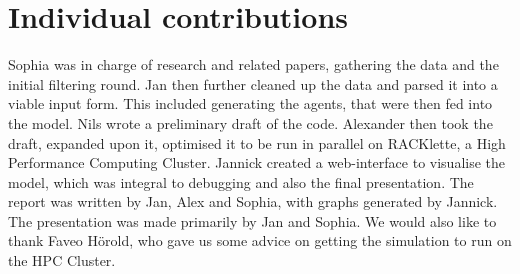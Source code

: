 \section{Individual contributions}
Sophia was in charge of research and related papers, gathering the data and the initial filtering round. Jan then further cleaned up the data and parsed it into a viable input form. This included generating the agents, that were then fed into the model. Nils wrote a preliminary draft of the code. Alexander then took the draft, expanded upon it, optimised it to be run in parallel on RACKlette, a High Performance Computing Cluster. Jannick created a web-interface to visualise the model, which was integral to debugging and also the final presentation. The report was written by Jan, Alex and Sophia, with graphs generated by Jannick. The presentation was made primarily by Jan and Sophia.
We would also like to thank Faveo Hörold, who gave us some advice on getting the simulation to run on the HPC Cluster.

